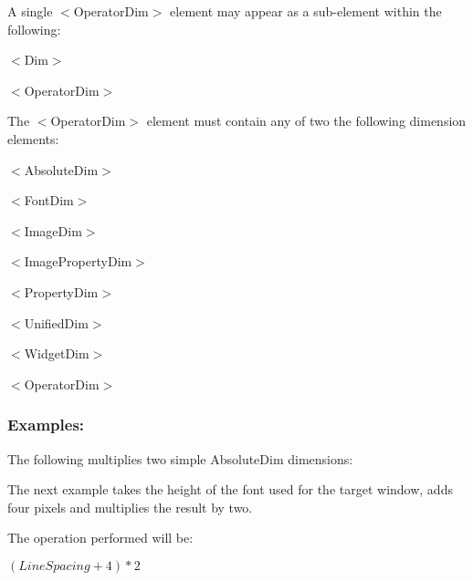 \begin{DoxyItemize}
\item A single {\ttfamily $<$Operator\+Dim$>$} element may appear as a sub-\/element within the following\+: 
\begin{DoxyItemize}
\item {\ttfamily $<$Dim$>$} 
\item {\ttfamily $<$Operator\+Dim$>$} 
\end{DoxyItemize}


\item The {\ttfamily $<$Operator\+Dim$>$} element must contain any of two the following dimension elements\+: 
\begin{DoxyItemize}
\item {\ttfamily $<$Absolute\+Dim$>$} 
\item {\ttfamily $<$Font\+Dim$>$} 
\item {\ttfamily $<$Image\+Dim$>$} 
\item {\ttfamily $<$Image\+Property\+Dim$>$} 
\item {\ttfamily $<$Property\+Dim$>$} 
\item {\ttfamily $<$Unified\+Dim$>$} 
\item {\ttfamily $<$Widget\+Dim$>$} 
\item {\ttfamily $<$Operator\+Dim$>$} 
\end{DoxyItemize}
\end{DoxyItemize}\hypertarget{fal_element_ref_fal_elem_ref_sec_operatordim_4}{}\subsubsection{Examples\+:}\label{fal_element_ref_fal_elem_ref_sec_operatordim_4}
The following multiplies two simple Absolute\+Dim dimensions\+: 
\begin{DoxyCode}{0}
\end{DoxyCode}


The next example takes the height of the font used for the target window, adds four pixels and multiplies the result by two.

The operation performed will be\+:

$ (LineSpacing + 4) {*} 2 $


